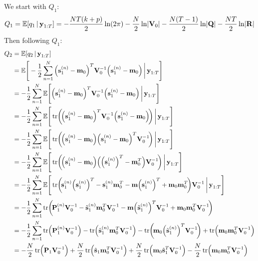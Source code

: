 We start with \(Q_1\):
\begin{equation*}
	Q_1 = \mathbb{E}[q_1 \,\vert\, \boldsymbol{\mathrm{y}}_{1:T}] = -\frac{NT(k + p)}{2} \ln(2\pi) - \frac{N}{2} \ln \lvert \boldsymbol{\mathrm{V}}_0 \rvert - \frac{N(T - 1)}{2} \ln \lvert \boldsymbol{\mathrm{Q}} \rvert - \frac{NT}{2} \ln \lvert \boldsymbol{\mathrm{R}} \rvert
\end{equation*}
Then following \(Q_1\):
\begin{align*}
	Q_2
		&= \E[q_2 \given \vec{y}_{1:T}] \\
		&= \E\Bigg[ -\frac{1}{2} \sum_{n = 1}^{N} \Big( \vec{s}_1^{(n)} - \vec{m}_0 \Big)^T \mat{V}_0^{-1} \Big( \vec{s}_1^{(n)} - \vec{m}_0 \Big) \bigggiven \vec{y}_{1:T} \Bigg] \\
		&= -\frac{1}{2} \sum_{n = 1}^{N} \E\Bigg[ \Big( \vec{s}_1^{(n)} - \vec{m}_0 \Big)^T \mat{V}_0^{-1} \Big( \vec{s}_1^{(n)} - \vec{m}_0 \Big) \bigggiven \vec{y}_{1:T} \Bigg] \\
		&= -\frac{1}{2} \sum_{n = 1}^{N} \E\Bigg[ \tr\!\bigg(\!\Big( \vec{s}_1^{(n)} - \vec{m}_0 \Big)^T \mat{V}_0^{-1} \Big( \vec{s}_1^{(n)} - \vec{m}_0 \Big)\!\bigg) \bigggiven \vec{y}_{1:T} \Bigg] \\
		&= -\frac{1}{2} \sum_{n = 1}^{N} \E\Bigg[ \tr\!\bigg(\!\Big( \vec{s}_1^{(n)} - \vec{m}_0 \Big) \Big( \vec{s}_1^{(n)} - \vec{m}_0 \Big)^T \mat{V}_0^{-1} \!\bigg) \bigggiven \vec{y}_{1:T} \Bigg] \\
		&= -\frac{1}{2} \sum_{n = 1}^{N} \E\Bigg[ \tr\!\bigg(\!\Big( \vec{s}_1^{(n)} - \vec{m}_0 \Big) \Big( \Big(\vec{s}_1^{(n)}\Big)^T - \vec{m}_0^T \Big) \mat{V}_0^{-1} \!\bigg) \bigggiven \vec{y}_{1:T} \Bigg] \\
		&= -\frac{1}{2} \sum_{n = 1}^{N} \E\Bigg[ \tr\!\bigg(\! \vec{s}_1^{(n)} \Big(\vec{s}_1^{(n)}\Big)^T - \vec{s}_1^{(n)} \vec{m}_0^T - \vec{m}\Big(\vec{s}_1^{(n)}\Big)^T + \vec{m}_0 \vec{m}_0^T \!\bigg) \mat{V}_0^{-1} \bigggiven \vec{y}_{1:T} \Bigg] \\
		&= -\frac{1}{2} \sum_{n = 1}^{N} \tr\!\bigg(\! \mat{P}_1^{(n)} \mat{V}_0^{-1} - \hat{\vec{s}}_1^{(n)} \vec{m}_0^T \mat{V}_0^{-1} - \vec{m}\Big(\hat{\vec{s}}_1^{(n)}\Big)^T \mat{V}_0^{-1} + \vec{m}_0 \vec{m}_0^T \mat{V}_0^{-1} \!\bigg) \\
		&= -\frac{1}{2} \sum_{n = 1}^{N} \tr\!\Big( \mat{P}_1^{(n)} \mat{V}_0^{-1} \Big) - \tr\!\Big( \hat{\vec{s}}_1^{(n)} \vec{m}_0^T \mat{V}_0^{-1} \Big) - \tr\!\bigg(\! \vec{m}_0 \Big(\hat{\vec{s}}_1^{(n)}\Big)^T \mat{V}_0^{-1} \!\bigg) + \tr\!\Big(\vec{m}_0 \vec{m}_0^T \mat{V}_0^{-1} \Big) \\
		&=  -\frac{N}{2} \tr\!\Big( \mat{P}_1 \mat{V}_0^{-1} \Big) + \frac{N}{2} \tr\!\Big( \hat{\vec{s}}_1 \vec{m}_0^T \mat{V}_0^{-1} \Big) + \frac{N}{2} \tr\!\Big( \vec{m}_0 \hat{\vec{s}}_1^T \mat{V}_0^{-1} \Big) - \frac{N}{2} \tr\!\Big(\vec{m}_0 \vec{m}_0^T \mat{V}_0^{-1} \Big)
\end{align*}
